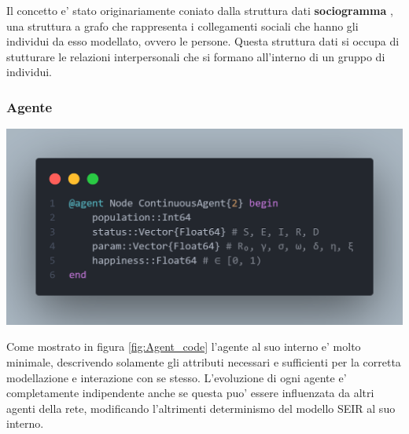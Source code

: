 Il concetto e' stato originariamente coniato dalla struttura dati \textbf{sociogramma} \cite{wiki:Sociogram}, 
una struttura a grafo che rappresenta i collegamenti sociali che hanno gli individui da esso modellato, ovvero le persone. 
Questa struttura dati si occupa di stutturare le relazioni interpersonali che si formano all'interno di un 
gruppo di individui. 

\subsubsection{Agente}

\begin{minipage}{\linewidth}
    \centering
    \includegraphics[width=\textwidth]{img/node_agent.png}
    \label{fig:Agent_code}
\end{minipage}

Come mostrato in figura \ref{fig:Agent_code} l'agente al suo interno e' molto minimale,
descrivendo solamente gli attributi necessari e sufficienti per la corretta modellazione
e interazione con se stesso. L'evoluzione di ogni agente e' completamente indipendente 
anche se questa puo' essere influenzata da altri agenti della rete, modificando l'altrimenti 
determinismo del modello SEIR al suo interno. 

